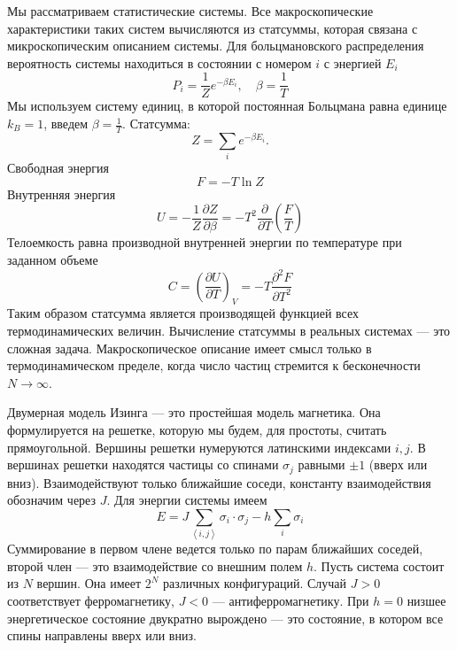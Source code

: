 \documentclass[a4paper,12pt]{article}
\theoremstyle{definition}
\theoremstyle{definition}
\theoremstyle{definition}
\begin{document}
Мы рассматриваем статистические системы. Все макроскопические характеристики таких систем
вычисляются из статсуммы, которая связана с микроскопическим описанием системы. Для больцмановского
распределения вероятность системы находиться в состоянии с номером $i$ с энергией $E_i$
\begin{equation}
  \label{eq:2}
  P_i=\frac{1}{Z}e^{-\beta E_i}, \quad \beta=\frac{1}{T}
\end{equation}
Мы используем систему единиц, в которой постоянная Больцмана равна единице $k_B=1$, введем
$\beta=\frac{1}{T}$. Статсумма:
\begin{equation}
  \label{eq:3}
  Z=\sum_i e^{-\beta E_i}.
\end{equation}
Свободная энергия
\begin{equation}
  \label{eq:4}
  F=-T\ln Z
\end{equation}
Внутренняя энергия
\begin{equation}
  \label{eq:5}
  U=-\frac{1}{Z}\frac{\partial Z}{\partial \beta}=-T^2 \frac{\partial}{\partial T}\left(\frac{F}{T}\right)
\end{equation}
Телоемкость равна производной внутренней энергии по температуре при заданном объеме
\begin{equation}
  \label{eq:6}
  C=\left(\frac{\partial U}{\partial T}\right)_V=-T\frac{\partial^2 F}{\partial T^2}
\end{equation}
Таким образом статсумма является производящей функцией всех термодинамических величин. Вычисление
статсуммы в реальных системах --- это сложная задача. Макроскопическое описание имеет смысл только в
термодинамическом пределе, когда число частиц стремится к бесконечности $N\to \infty$.

Двумерная модель Изинга --- это простейшая модель магнетика. Она формулируется на решетке, которую
мы будем, для простоты, считать прямоугольной. Вершины решетки нумеруются латинскими индексами
$i,j$. В вершинах решетки находятся частицы со спинами $\sigma_j$ равными $\pm 1$ (вверх или вниз).
Взаимодействуют только ближайшие соседи, константу взаимодействия обозначим через $J$. Для энергии
системы имеем
\begin{equation}
  \label{eq:1}
  E=J\sum_{\left<i,j\right>} \sigma_i\cdot \sigma_j-h\sum_i \sigma_i
\end{equation}
Суммирование в первом члене ведется только по парам ближайших соседей, второй член --- это
взаимодействие со внешним полем $h$. Пусть система состоит из $N$ вершин. Она имеет $2^N$ различных
конфигураций. Случай $J>0$ соответствует ферромагнетику, $J<0$ --- антиферромагнетику. При $h=0$
низшее энергетическое состояние двукратно вырождено --- это состояние, в котором все спины
направлены вверх или вниз.
\end{document}
